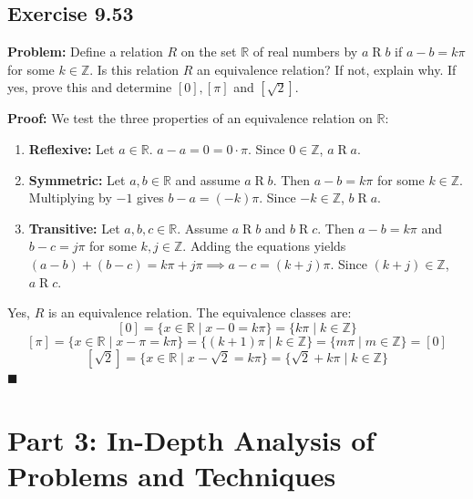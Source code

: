\documentclass[11pt, a4paper]{article}
\theoremstyle{definition}
\theoremstyle{remark}
\begin{document}
\subsection*{Exercise 9.53}
\textbf{Problem:} Define a relation $R$ on the set $\mathbb{R}$ of real numbers by $a \mathrel{R} b$ if $a - b = k\pi$ for some $k \in \mathbb{Z}$. Is this relation $R$ an equivalence relation? If not, explain why. If yes, prove this and determine $[0], [\pi]$ and $[\sqrt{2}]$.

\textbf{Proof:}
We test the three properties of an equivalence relation on $\mathbb{R}$:
\begin{enumerate}
    \item \textbf{Reflexive:} Let $a \in \mathbb{R}$. $a - a = 0 = 0 \cdot \pi$. Since $0 \in \mathbb{Z}$, $a \mathrel{R} a$.
    \item \textbf{Symmetric:} Let $a, b \in \mathbb{R}$ and assume $a \mathrel{R} b$. Then $a - b = k\pi$ for some $k \in \mathbb{Z}$. Multiplying by $-1$ gives $b - a = (-k)\pi$. Since $-k \in \mathbb{Z}$, $b \mathrel{R} a$.
    \item \textbf{Transitive:} Let $a, b, c \in \mathbb{R}$. Assume $a \mathrel{R} b$ and $b \mathrel{R} c$. Then $a - b = k\pi$ and $b - c = j\pi$ for some $k, j \in \mathbb{Z}$. Adding the equations yields $(a - b) + (b - c) = k\pi + j\pi \implies a - c = (k + j)\pi$. Since $(k + j) \in \mathbb{Z}$, $a \mathrel{R} c$.
\end{enumerate}
Yes, $R$ is an equivalence relation. 
The equivalence classes are:
\[ \displaystyle [0] = \{ x \in \mathbb{R} \mid x - 0 = k\pi \} = \{ k\pi \mid k \in \mathbb{Z} \} \]
\[ \displaystyle [\pi] = \{ x \in \mathbb{R} \mid x - \pi = k\pi \} = \{ (k+1)\pi \mid k \in \mathbb{Z} \} = \{ m\pi \mid m \in \mathbb{Z} \} = [0] \]
\[ \displaystyle [\sqrt{2}] = \{ x \in \mathbb{R} \mid x - \sqrt{2} = k\pi \} = \{ \sqrt{2} + k\pi \mid k \in \mathbb{Z} \} \]
$\blacksquare$

\newpage
\section{Part 3: In-Depth Analysis of Problems and Techniques}
\end{document}
